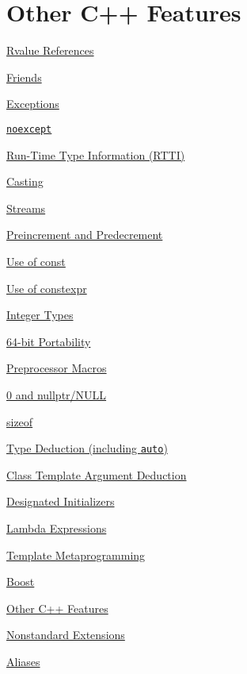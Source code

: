 
\chapter{Other C++ Features}\label{ch:other-c++-features}

\begin{introduction}
    \item \hyperref[sec:rvalue-references]{Rvalue References}
    \item \hyperref[sec:friends]{Friends}
    \item \hyperref[sec:exceptions]{Exceptions}
    \item \hyperref[sec:noexcept]{\texttt{noexcept}}
    \item \hyperref[sec:run-time-type-information-(rtti)]{Run-Time Type Information (RTTI)}
    \item \hyperref[sec:casting]{Casting}
    \item \hyperref[sec:streams]{Streams}
    \item \hyperref[sec:preincrement-and-predecrement]{Preincrement and Predecrement}
    \item \hyperref[sec:use-of-const]{Use of const}
    \item \hyperref[sec:use-of-constexpr]{Use of constexpr}
    \item \hyperref[sec:integer-types]{Integer Types}
    \item \hyperref[sec:64-bit-portability]{64-bit Portability}
    \item \hyperref[sec:preprocessor-macros]{Preprocessor Macros}
    \item \hyperref[sec:0-and-nullptr/null]{0 and nullptr/NULL}
    \item \hyperref[sec:sizeof]{sizeof}
    \item \hyperref[sec:type-deduction-(including-auto)]{Type Deduction (including \texttt{auto})}
    \item \hyperref[sec:class-template-argument-deduction]{Class Template Argument Deduction}
    \item \hyperref[sec:designated-initializers]{Designated Initializers}
    \item \hyperref[ch07:sec:lambda-expressions]{Lambda Expressions}
    \item \hyperref[sec:template-metaprogramming]{Template Metaprogramming}
    \item \hyperref[sec:boost]{Boost}
    \item \hyperref[sec:other-c++-features]{Other C++ Features}
    \item \hyperref[sec:nonstandard-extensions]{Nonstandard Extensions}
    \item \hyperref[sec:aliases]{Aliases}
\end{introduction}

